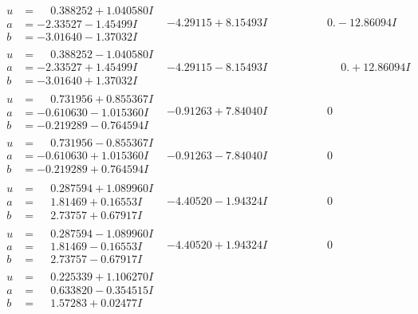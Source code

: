 \documentclass[1p]{elsarticle_modified}
\theoremstyle{definition}
\begin{document}
$$\begin{array}{c|c|c}
\begin{aligned}
u &= \phantom{-}0.388252 + 1.040580 I \\
a &= -2.33527 - 1.45499 I \\
b &= -3.01640 - 1.37032 I\end{aligned}
 & -4.29115 + 8.15493 I & \phantom{-0.000000 } 0. - 12.86094 I \\ \hline\begin{aligned}
u &= \phantom{-}0.388252 - 1.040580 I \\
a &= -2.33527 + 1.45499 I \\
b &= -3.01640 + 1.37032 I\end{aligned}
 & -4.29115 - 8.15493 I & \phantom{-0.000000 -}0. + 12.86094 I \\ \hline\begin{aligned}
u &= \phantom{-}0.731956 + 0.855367 I \\
a &= -0.610630 - 1.015360 I \\
b &= -0.219289 - 0.764594 I\end{aligned}
 & -0.91263 + 7.84040 I & \phantom{-0.000000 } 0 \\ \hline\begin{aligned}
u &= \phantom{-}0.731956 - 0.855367 I \\
a &= -0.610630 + 1.015360 I \\
b &= -0.219289 + 0.764594 I\end{aligned}
 & -0.91263 - 7.84040 I & \phantom{-0.000000 } 0 \\ \hline\begin{aligned}
u &= \phantom{-}0.287594 + 1.089960 I \\
a &= \phantom{-}1.81469 + 0.16553 I \\
b &= \phantom{-}2.73757 + 0.67917 I\end{aligned}
 & -4.40520 - 1.94324 I & \phantom{-0.000000 } 0 \\ \hline\begin{aligned}
u &= \phantom{-}0.287594 - 1.089960 I \\
a &= \phantom{-}1.81469 - 0.16553 I \\
b &= \phantom{-}2.73757 - 0.67917 I\end{aligned}
 & -4.40520 + 1.94324 I & \phantom{-0.000000 } 0 \\ \hline\begin{aligned}
u &= \phantom{-}0.225339 + 1.106270 I \\
a &= \phantom{-}0.633820 - 0.354515 I \\
b &= \phantom{-}1.57283 + 0.02477 I\end{aligned}

\end{array}$$
\end{document}
